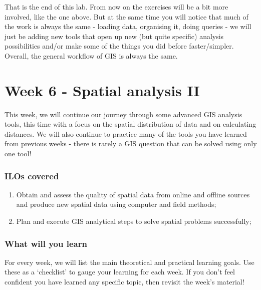 \documentclass[
  letterpaper,
  DIV=11,
  numbers=noendperiod]{scrreprt}
\begin{document}
That is the end of this lab. From now on the exercises will be a bit
more involved, like the one above. But at the same time you will notice
that much of the work is always the same - loading data, organising it,
doing queries - we will just be adding new tools that open up new (but
quite specific) analysis possibilities and/or make some of the things
you did before faster/simpler. Overall, the general workflow of GIS is
always the same.

\part{Week 6 - Spatial analysis II}

This week, we will continue our journey through some advanced GIS
analysis tools, this time with a focus on the spatial distribution of
data and on calculating distances. We will also continue to practice
many of the tools you have learned from previous weeks - there is rarely
a GIS question that can be solved using only one tool!

\section*{ILOs covered}\label{ilos-covered-5}


\begin{enumerate}
\def\labelenumi{\arabic{enumi}.}
\setcounter{enumi}{1}
\item
  Obtain and assess the quality of spatial data from online and offline
  sources and produce new spatial data using computer and field methods;
\item
  Plan and execute GIS analytical steps to solve spatial problems
  successfully;
\end{enumerate}

\section*{What will you learn}\label{what-will-you-learn-5}


For every week, we will list the main theoretical and practical learning
goals. Use these as a `checklist' to gauge your learning for each week.
If you don't feel confident you have learned any specific topic, then
revisit the week's material!
\end{document}
